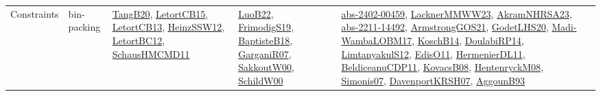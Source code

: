 {\begin{longtable}{lp{3cm}>{\raggedright}p{6cm}>{\raggedright}p{6cm}p{8cm}}
Constraints & bin-packing & \href{papers/TangB20.pdf}{TangB20}\cite{TangB20}, \href{articles/LetortCB15.pdf}{LetortCB15}\cite{LetortCB15}, \href{papers/LetortCB13.pdf}{LetortCB13}\cite{LetortCB13}, \href{articles/HeinzSSW12.pdf}{HeinzSSW12}\cite{HeinzSSW12}, \href{papers/LetortBC12.pdf}{LetortBC12}\cite{LetortBC12}, \href{articles/SchausHMCMD11.pdf}{SchausHMCMD11}\cite{SchausHMCMD11} & \href{papers/LuoB22.pdf}{LuoB22}\cite{LuoB22}, \href{papers/FrimodigS19.pdf}{FrimodigS19}\cite{FrimodigS19}, \href{articles/BaptisteB18.pdf}{BaptisteB18}\cite{BaptisteB18}, \href{papers/GarganiR07.pdf}{GarganiR07}\cite{GarganiR07}, \href{articles/SakkoutW00.pdf}{SakkoutW00}\cite{SakkoutW00}, \href{articles/SchildW00.pdf}{SchildW00}\cite{SchildW00} & \href{articles/abs-2402-00459.pdf}{abs-2402-00459}\cite{abs-2402-00459}, \href{articles/LacknerMMWW23.pdf}{LacknerMMWW23}\cite{LacknerMMWW23}, \href{articles/AkramNHRSA23.pdf}{AkramNHRSA23}\cite{AkramNHRSA23}, \href{articles/abs-2211-14492.pdf}{abs-2211-14492}\cite{abs-2211-14492}, \href{papers/ArmstrongGOS21.pdf}{ArmstrongGOS21}\cite{ArmstrongGOS21}, \href{papers/GodetLHS20.pdf}{GodetLHS20}\cite{GodetLHS20}, \href{papers/Madi-WambaLOBM17.pdf}{Madi-WambaLOBM17}\cite{Madi-WambaLOBM17}, \href{papers/KoschB14.pdf}{KoschB14}\cite{KoschB14}, \href{papers/DoulabiRP14.pdf}{DoulabiRP14}\cite{DoulabiRP14}, \href{articles/LimtanyakulS12.pdf}{LimtanyakulS12}\cite{LimtanyakulS12}, \href{papers/EdisO11.pdf}{EdisO11}\cite{EdisO11}, \href{papers/HermenierDL11.pdf}{HermenierDL11}\cite{HermenierDL11}, \href{articles/BeldiceanuCDP11.pdf}{BeldiceanuCDP11}\cite{BeldiceanuCDP11}, \href{articles/KovacsB08.pdf}{KovacsB08}\cite{KovacsB08}, \href{papers/HentenryckM08.pdf}{HentenryckM08}\cite{HentenryckM08}, \href{articles/Simonis07.pdf}{Simonis07}\cite{Simonis07}, \href{papers/DavenportKRSH07.pdf}{DavenportKRSH07}\cite{DavenportKRSH07}, \href{articles/AggounB93.pdf}{AggounB93}\cite{AggounB93}\\

\end{longtable}}
